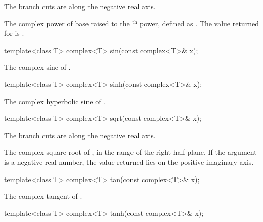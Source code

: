 \begin{itemdescr}
\pnum
\remarks
The branch cuts are along the negative real axis.

\pnum
\returns
The complex power of base  raised to the $^\text{th}$ power,
defined as
.
The value returned for
is .
\end{itemdescr}

%
\begin{itemdecl}
template<class T> complex<T> sin(const complex<T>& x);
\end{itemdecl}

\begin{itemdescr}
\pnum
\returns
The complex sine of .
\end{itemdescr}

%
\begin{itemdecl}
template<class T> complex<T> sinh(const complex<T>& x);
\end{itemdecl}

\begin{itemdescr}
\pnum
\returns
The complex hyperbolic sine of .
\end{itemdescr}

%
\begin{itemdecl}
template<class T> complex<T> sqrt(const complex<T>& x);
\end{itemdecl}

\begin{itemdescr}
\pnum
\remarks
The branch cuts are along the negative real axis.

\pnum
\returns
The complex square root of , in the range of the right
half-plane.
If the argument is a negative real number, the
value returned lies on the positive imaginary axis.
\end{itemdescr}

%
\begin{itemdecl}
template<class T> complex<T> tan(const complex<T>& x);
\end{itemdecl}

\begin{itemdescr}
\pnum
\returns
The complex tangent of .
\end{itemdescr}

%
\begin{itemdecl}
template<class T> complex<T> tanh(const complex<T>& x);
\end{itemdecl}

